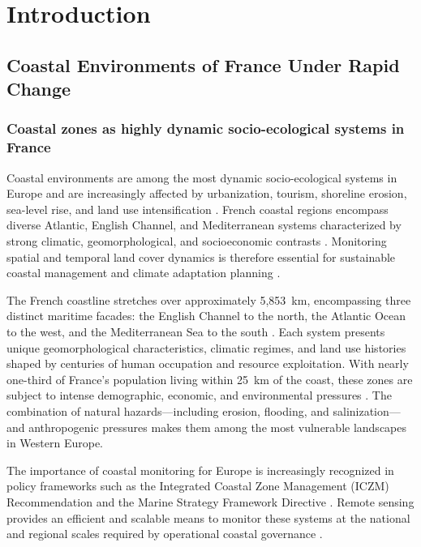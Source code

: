\documentclass[remotesensing,article,submit,pdftex,moreauthors]{Definitions/mdpi}
\begin{document}
\section{Introduction}

\subsection{Coastal Environments of France Under Rapid Change}

\subsubsection{Coastal zones as highly dynamic socio-ecological systems in France}

Coastal environments are among the most dynamic socio-ecological systems in Europe and are increasingly affected by urbanization, tourism, shoreline erosion, sea-level rise, and land use intensification \citep{Petzold2024, Igigabel2024, IPCCar6wg2}. French coastal regions encompass diverse Atlantic, English Channel, and Mediterranean systems characterized by strong climatic, geomorphological, and socioeconomic contrasts \citep{Karadimitriou2022}. Monitoring spatial and temporal land cover dynamics is therefore essential for sustainable coastal management and climate adaptation planning \citep{Vousdoukas2020, MedelaMarMed2024}.

The French coastline stretches over approximately 5,853~km, encompassing three distinct maritime facades: the English Channel to the north, the Atlantic Ocean to the west, and the Mediterranean Sea to the south \cite{clave2021littoraux}. Each system presents unique geomorphological characteristics, climatic regimes, and land use histories shaped by centuries of human occupation and resource exploitation. With nearly one-third of France's population living within 25~km of the coast, these zones are subject to intense demographic, economic, and environmental pressures \citep{sdes2024merlittoral}. The combination of natural hazards—including erosion, flooding, and salinization—and anthropogenic pressures makes them among the most vulnerable landscapes in Western Europe.

The importance of coastal monitoring for Europe is increasingly recognized in policy frameworks such as the Integrated Coastal Zone Management (ICZM) Recommendation and the Marine Strategy Framework Directive \citep{EEA2019}. Remote sensing provides an efficient and scalable means to monitor these systems at the national and regional scales required by operational coastal governance \citep{Graffin2024, Liu2023}.
\end{document}
